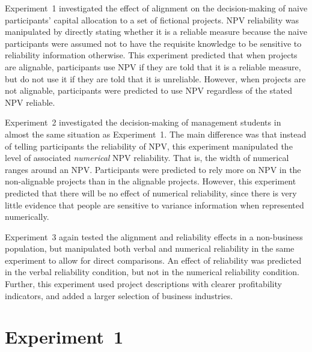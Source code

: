 \documentclass[a4paper, nobind, dvipsnames]{templates/ociamthesis}
\theoremstyle{definition}
\theoremstyle{definition}
\theoremstyle{definition}
\theoremstyle{definition}
\theoremstyle{remark}
\begin{document}
Experiment~1 investigated the effect of alignment on the decision-making of
naive participants' capital allocation to a set of fictional projects. NPV
reliability was manipulated by directly stating whether it is a reliable measure
because the naive participants were assumed not to have the requisite knowledge
to be sensitive to reliability information otherwise. This experiment predicted
that when projects are alignable, participants use NPV if they are told that it
is a reliable measure, but do not use it if they are told that it is unreliable.
However, when projects are not alignable, participants were predicted to use NPV
regardless of the stated NPV reliable.

Experiment~2 investigated the decision-making of management students in almost
the same situation as Experiment~1. The main difference was that instead of
telling participants the reliability of NPV, this experiment manipulated the
level of associated \emph{numerical} NPV reliability. That is, the width of numerical
ranges around an NPV. Participants were predicted to rely more on NPV in the
non-alignable projects than in the alignable projects. However, this experiment
predicted that there will be no effect of numerical reliability, since there is
very little evidence that people are sensitive to variance information when
represented numerically.

Experiment~3 again tested the alignment and reliability effects in a
non-business population, but manipulated both verbal and numerical reliability
in the same experiment to allow for direct comparisons. An effect of reliability
was predicted in the verbal reliability condition, but not in the numerical
reliability condition. Further, this experiment used project descriptions with
clearer profitability indicators, and added a larger selection of business
industries.

\hypertarget{alignment-2}{%
\section{Experiment~1}\label{alignment-2}}
\end{document}
